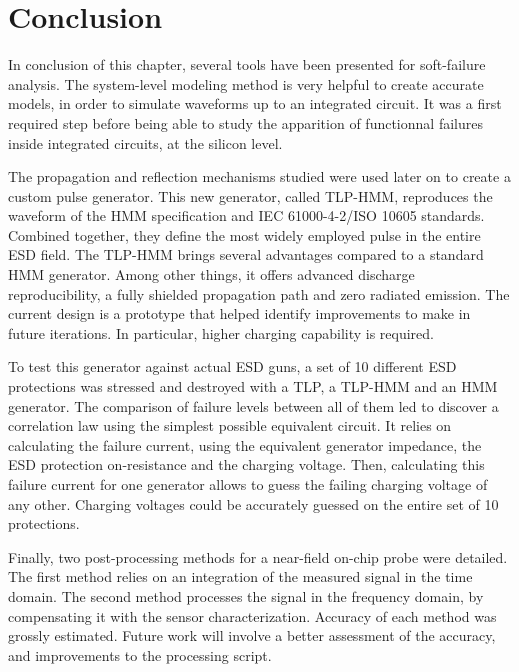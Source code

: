 \section{Conclusion}

In conclusion of this chapter, several tools have been presented for soft-failure analysis.
The system-level modeling method is very helpful to create accurate models, in order to simulate waveforms up to an integrated circuit.
It was a first required step before being able to study the apparition of functionnal failures inside integrated circuits, at the silicon level.

The propagation and reflection mechanisms studied were used later on to create a custom pulse generator.
This new generator, called TLP-HMM, reproduces the waveform of the HMM specification and IEC 61000-4-2/ISO 10605 standards.
Combined together, they define the most widely employed pulse in the entire ESD field.
The TLP-HMM brings several advantages compared to a standard HMM generator.
Among other things, it offers advanced discharge reproducibility, a fully shielded propagation path and zero radiated emission.
The current design is a prototype that helped identify improvements to make in future iterations.
In particular, higher charging capability is required.

To test this generator against actual ESD guns, a set of 10 different ESD protections was stressed and destroyed with a TLP, a TLP-HMM and an HMM generator.
The comparison of failure levels between all of them led to discover a correlation law using the simplest possible equivalent circuit.
It relies on calculating the failure current, using the equivalent generator impedance, the ESD protection on-resistance and the charging voltage.
Then, calculating this failure current for one generator allows to guess the failing charging voltage of any other.
Charging voltages could be accurately guessed on the entire set of 10 protections.

Finally, two post-processing methods for a near-field on-chip probe were detailed.
The first method relies on an integration of the measured signal in the time domain.
The second method processes the signal in the frequency domain, by compensating it with the sensor characterization.
Accuracy of each method was grossly estimated.
Future work will involve a better assessment of the accuracy, and improvements to the processing script.
